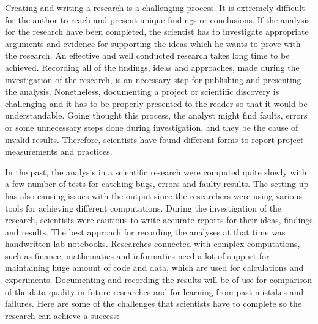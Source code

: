 Creating and writing a research is a challenging process. It is extremely difficult for the author to reach and present unique findings or conclusions. If the analysis for the research have been completed, the scientist has to investigate appropriate arguments and evidence for supporting the ideas which he wants to prove with the research. An effective and well conducted research takes long time to be achieved. Recording all of the findings, ideas and approaches, made during the investigation of the research, is an necessary step for publishing and presenting the analysis. Nonetheless, documenting a project or scientific discovery is challenging and it has to be properly presented to the reader so that it would be understandable. Going thought this process, the analyst might find faults, errors or some unnecessary steps done during investigation, and they be the cause of invalid results. Therefore, scientists have found different forms to report project measurements and practices.\cite{holmes2003reworking}

In the past, the analysis in a scientific research were computed quite slowly with a few number of tests for catching bugs, errors and faulty results. The setting up has also causing issues with the output since the researchers were using various tools for achieving different computations. During the investigation of the research, scientists were cautious to write accurate reports for their ideas, findings and results. The best approach for recording the analyses at that time was handwritten lab notebooks. Researches connected with complex computations, such as finance, mathematics and informatics need a lot of support for maintaining huge amount of code and data, which are used for calculations and experiments. Documenting and recording the results will be of use for comparison of the data quality in future researches and for learning from past mistakes and failures.\cite{guo2012burrito}
Here are some of the challenges that scientists have to complete so the research can achieve a success:\cite{guo2012burrito}

